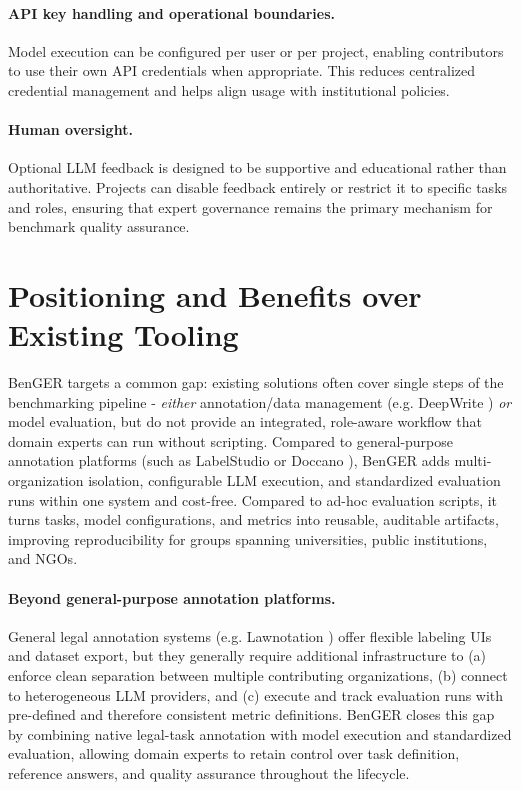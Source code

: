 \documentclass[sigconf]{acmart}
\begin{document}
\paragraph{API key handling and operational boundaries.}
Model execution can be configured per user or per project, enabling contributors to use their own API credentials when appropriate. This reduces centralized credential management and helps align usage with institutional policies.

\paragraph{Human oversight.}
Optional LLM feedback is designed to be supportive and educational rather than authoritative. Projects can disable feedback entirely or restrict it to specific tasks and roles, ensuring that expert governance remains the primary mechanism for benchmark quality assurance.

\section{Positioning and Benefits over Existing Tooling}
BenGER targets a common gap: existing solutions often cover single steps of the benchmarking pipeline - \emph{either} annotation/data management (e.g. DeepWrite \citep{kramerDeepWrite2024}) \emph{or} model evaluation, but do not provide an integrated, role-aware workflow that domain experts can run without scripting.
Compared to general-purpose annotation platforms (such as LabelStudio or Doccano \citep{labelstudio,doccano}), BenGER adds multi-organization isolation, configurable LLM execution, and standardized evaluation runs within one system and cost-free. Compared to ad-hoc evaluation scripts, it turns tasks, model configurations, and metrics into reusable, auditable artifacts, improving reproducibility for groups spanning universities, public institutions, and NGOs.

\paragraph{Beyond general-purpose annotation platforms.}
General legal annotation systems (e.g. Lawnotation \citep{vandijkLawnotation2022}) offer flexible labeling UIs and dataset export, but they generally require additional infrastructure to (a) enforce clean separation between multiple contributing organizations, (b) connect to heterogeneous LLM providers, and (c) execute and track evaluation runs with pre-defined and therefore consistent metric definitions.
BenGER closes this gap by combining native legal-task annotation with model execution and standardized evaluation, allowing domain experts to retain control over task definition, reference answers, and quality assurance throughout the lifecycle.
\end{document}
